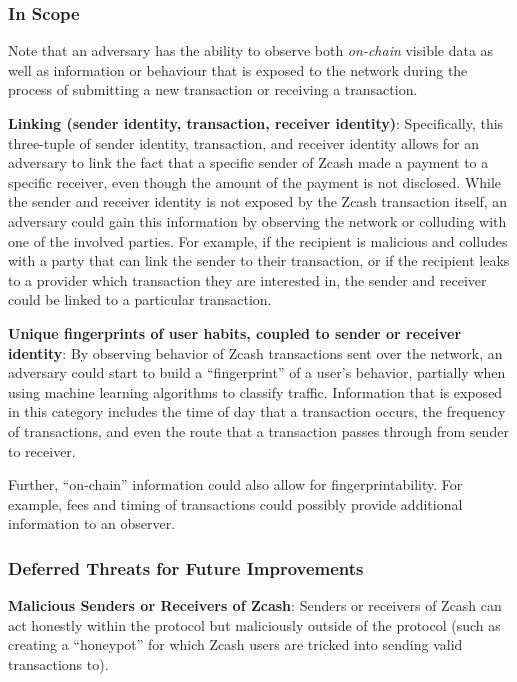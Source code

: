 \documentclass{article}
\begin{document}
\subsubsection{In Scope}
\label{in-scope}

Note that an adversary has the ability to observe both \emph{on-chain} visible
data as well as information or behaviour that is exposed to the network during
the process of submitting a new transaction or receiving a transaction.

\textbf{Linking (sender identity, transaction, receiver identity)}:
Specifically, this three-tuple of sender identity, transaction, and receiver
identity allows for an adversary to link the fact that a
specific sender of Zcash made a payment to a specific receiver, even though the
amount of the payment is not disclosed. While the sender and receiver identity
is not exposed by the Zcash transaction itself, an adversary
could gain this information by observing the network or colluding
with one of the involved parties. For example, if the recipient is
malicious and colludes with a party that can link the sender to their
transaction, or if the recipient leaks to a provider which transaction they
are interested in, the sender and receiver could be linked to a particular
transaction.


\textbf{Unique fingerprints of user habits, coupled to sender or receiver
identity}: By observing behavior of Zcash
transactions sent over the network, an adversary could start to build a
“fingerprint” of a user’s behavior, partially when using machine learning
algorithms to classify traffic. Information that is exposed in this
category includes the time of day that a transaction occurs, the frequency
of transactions, and even the route that a transaction passes through from
sender to receiver.

Further, ``on-chain'' information could also allow for fingerprintability. For
example, fees and timing of transactions could possibly provide additional
information to an observer.

\subsubsection{Deferred Threats for Future Improvements}

\textbf{Malicious Senders or Receivers of Zcash}:
Senders or receivers of Zcash can act honestly within the protocol but
maliciously outside of the protocol (such as creating a ``honeypot'' for which
Zcash users are tricked into sending valid transactions to).
\end{document}

